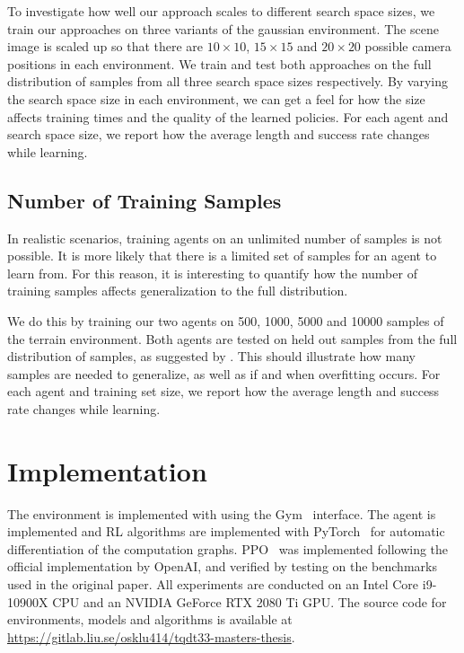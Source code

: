 To investigate how well our approach scales to different search space sizes, we train our approaches on three variants of the gaussian environment.
The scene image is scaled up so that there are \(10 \times 10\), \(15 \times 15\) and \(20 \times 20\) possible camera positions in each environment.
We train and test both approaches on the full distribution of samples from all three search space sizes respectively.
By varying the search space size in each environment, we can get a feel for how the size affects training times and the quality of the learned policies.
For each agent and search space size, we report how the average length and success rate changes while learning.

\subsection{Number of Training Samples}

In realistic scenarios, training agents on an unlimited number of samples is not possible.
It is more likely that there is a limited set of samples for an agent to learn from.
For this reason, it is interesting to quantify how the number of training samples affects generalization to the full distribution.

We do this by training our two agents on 500, 1000, 5000 and 10000 samples of the terrain environment.
Both agents are tested on held out samples from the full distribution of samples, as suggested by \cite{cobbe_leveraging_2020}.
This should illustrate how many samples are needed to generalize, as well as if and when overfitting occurs.
For each agent and training set size, we report how the average length and success rate changes while learning.

%

\section{Implementation}

The environment is implemented with using the Gym~\cite{brockman_openai_2016} interface. The agent is implemented and RL algorithms are implemented with PyTorch~\cite{paszke_pytorch_2019} for automatic differentiation of the computation graphs.
PPO~\cite{schulman_proximal_2017} was implemented following the official implementation by OpenAI,
and verified by testing on the benchmarks used in the original paper.
All experiments are conducted on an Intel Core i9-10900X CPU and an NVIDIA GeForce RTX 2080 Ti GPU.
The source code for environments, models and algorithms is available at \url{https://gitlab.liu.se/osklu414/tqdt33-masters-thesis}.
